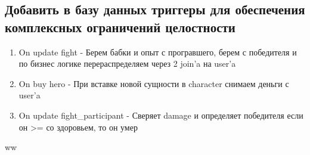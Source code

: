 \subsection*{Добавить в базу данных триггеры для обеспечения комплексных ограничений
целостности}


\begin{enumerate}
    \item On update fight 
    - Берем бабки и опыт с програвшего, берем с победителя и по бизнес логике перераспределяем через 2 join'a на user'a

    \item On buy hero
    - При вставке новой сущности в character снимаем деньги с user'a

    \item On update fight\_participant
    - Сверяет damage и определяет победителя если он >= со здоровьем, то он умер
    
\end{enumerate}ww
